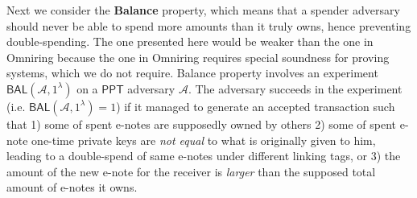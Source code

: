 \documentclass{article}
\begin{document}
Next we consider the \textbf{Balance} property, which means that a spender adversary should never be able to spend more amounts than it truly owns, hence preventing double-spending. The one presented here would be weaker than the one in Omniring because the one in Omniring requires special soundness for proving systems, which we do not require. Balance property involves an experiment $\textsf{BAL}(\mathcal{A}, 1^{\lambda})$  on a $\textsf{PPT}$ adversary $\mathcal{A}$. The adversary succeeds in the experiment (i.e. $\textsf{BAL}(\mathcal{A}, 1^{\lambda})=1$) if it managed to generate an accepted transaction such that 1) some of spent e-notes are supposedly owned by others 2) some of spent e-note one-time private keys are \textit{not equal} to what is originally given to him, leading to a double-spend of same e-notes under different linking tags, or 3) the amount of the new e-note for the receiver is \textit{larger} than the supposed total amount of e-notes it owns.
\end{document}
